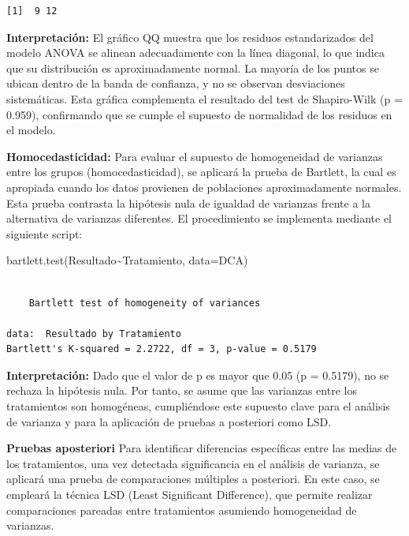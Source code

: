 \documentclass[
  spanish,
  letterpaper,
  DIV=11,
  numbers=noendperiod]{scrreprt}
\newenvironment{Shaded}{\begin{snugshade}}{\end{snugshade}}
\newcommand{\AttributeTok}[1]{\textcolor[rgb]{0.40,0.45,0.13}{#1}}
\newcommand{\FunctionTok}[1]{\textcolor[rgb]{0.28,0.35,0.67}{#1}}
\newcommand{\NormalTok}[1]{\textcolor[rgb]{0.00,0.23,0.31}{#1}}
\newcommand{\SpecialCharTok}[1]{\textcolor[rgb]{0.37,0.37,0.37}{#1}}
\begin{document}
\begin{verbatim}
[1]  9 12
\end{verbatim}

\textbf{Interpretación:} El gráfico QQ muestra que los residuos
estandarizados del modelo ANOVA se alinean adecuadamente con la línea
diagonal, lo que indica que su distribución es aproximadamente normal.
La mayoría de los puntos se ubican dentro de la banda de confianza, y no
se observan desviaciones sistemáticas. Esta gráfica complementa el
resultado del test de Shapiro-Wilk (p = 0.959), confirmando que se
cumple el supuesto de normalidad de los residuos en el modelo.

\textbf{Homocedasticidad:} Para evaluar el supuesto de homogeneidad de
varianzas entre los grupos (homocedasticidad), se aplicará la prueba de
Bartlett, la cual es apropiada cuando los datos provienen de poblaciones
aproximadamente normales. Esta prueba contrasta la hipótesis nula de
igualdad de varianzas frente a la alternativa de varianzas diferentes.
El procedimiento se implementa mediante el siguiente script:

\begin{Shaded}
\begin{Highlighting}[]
\FunctionTok{bartlett.test}\NormalTok{(Resultado}\SpecialCharTok{\textasciitilde{}}\NormalTok{Tratamiento, }\AttributeTok{data=}\NormalTok{DCA)}
\end{Highlighting}
\end{Shaded}

\begin{verbatim}

    Bartlett test of homogeneity of variances

data:  Resultado by Tratamiento
Bartlett's K-squared = 2.2722, df = 3, p-value = 0.5179
\end{verbatim}

\textbf{Interpretación:} Dado que el valor de p es mayor que 0.05 (p =
0.5179), no se rechaza la hipótesis nula. Por tanto, se asume que las
varianzas entre los tratamientos son homogéneas, cumpliéndose este
supuesto clave para el análisis de varianza y para la aplicación de
pruebas a posteriori como LSD.

\textbf{Pruebas aposteriori} Para identificar diferencias específicas
entre las medias de los tratamientos, una vez detectada significancia en
el análisis de varianza, se aplicará una prueba de comparaciones
múltiples a posteriori. En este caso, se empleará la técnica LSD (Least
Significant Difference), que permite realizar comparaciones pareadas
entre tratamientos asumiendo homogeneidad de varianzas.
\end{document}
